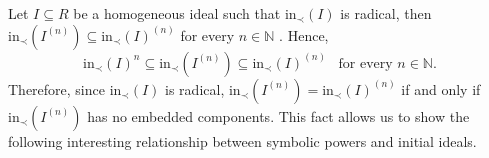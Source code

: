 \documentclass[12pt]{amsart}
\newtheorem{proposition}[proposition]{Proposition}
\theoremstyle{definition}
\newcommand{\jonathan}[1]{{\color{purple} \sf $\clubsuit$ Jonathan: [#1]}}
\renewcommand{\(}{\left(}
\renewcommand{\)}{\right)}
\newcommand{\NN}{\mathbb{N} }
\newcommand{\kk}{\mathbb{k}}
\newcommand{\IN}{\operatorname{in}}
\DeclareMathOperator{\chara}{{{char}}}
\renewcommand{\!}[1]{{\color{red}\text{\Huge$\star$ }#1}}
\newcommand{\init}{\mathrm{in}}
\begin{document}
Let $I\subseteq R$ be a homogeneous ideal such that  $\init_\prec(I)$ is radical, then   
$\init_\prec\left (I^{(n)}\right)\subseteq \init_\prec(I)^{(n)}$  for every  $n\in\NN$   \cite[Proposition 5.1]{Sull}. 
Hence, \[\init_\prec(I)^n\subseteq \init_\prec\left (I^{(n)}\right)\subseteq \init_\prec(I)^{(n)} \,\,\,\text{ for every }n\in\NN.\]
Therefore, since $\init_\prec(I)$ is radical,  $\init_\prec\left (I^{(n)}\right)=\init_\prec(I)^{(n)}$ if and only if $\init_\prec\left (I^{(n)}\right)$ has no embedded components. This fact allows us to show the following interesting relationship between symbolic powers and initial ideals.
%
\end{document}
